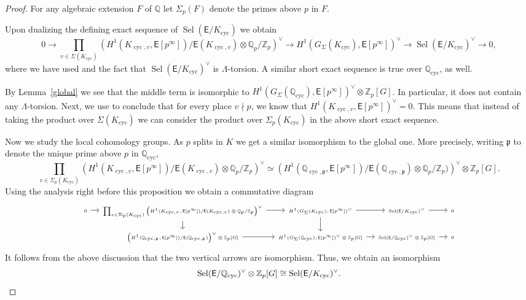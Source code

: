 \documentclass{amsart}
\numberwithin{equation}{section}
\theoremstyle{remark}
\newcommand{\cyc}{\operatorname{cyc}}
\newcommand{\Sel}{\operatorname{Sel}}
\newcommand{\Z}{\mathbb{Z}}
\newcommand{\Qp}{\mathbb{Q}_p}
\newcommand{\Q}{\mathbb{Q}}
\newcommand{\EC}{\mathsf{E}}
\newcommand{\fp}{\mathfrak{p}}
\theoremstyle{plain} %
\begin{document}
\begin{proof}
For any algebraic extension $F$ of $\Q$ let $\Sigma_p(F)$ denote the primes above $p$ in $F$.


Upon dualizing the defining exact sequence of $\Sel(\EC/K_{\cyc})$ we obtain
\[
0 \longrightarrow \prod_{v\in \Sigma(K_{\cyc})}\left(H^1(K_{\cyc,v},\EC[p^\infty])/\EC(K_{\cyc,v})\otimes \Qp/\Z_p\right)^\vee \longrightarrow H^1(G_\Sigma(K_{\cyc}),\EC[p^\infty])^\vee\longrightarrow \Sel(\EC/K_{\cyc})^\vee\longrightarrow 0,
\]
where we have used \cite[Proposition~2.1]{greenberg-vatsal} and the fact that $\Sel(\EC/K_{\cyc})^\vee$ is $\Lambda$-torsion.
A similar short exact sequence is true over $\Q_{\cyc}$, as well.

By Lemma~\ref{global} we see that the middle term is isomorphic to $H^1(G_\Sigma(\Q_{\cyc}),\EC[p^\infty])^\vee \otimes \Z_p[G]$.
In particular, it does not contain any $\Lambda$-torsion.
Next, we use \cite[Proposition~2]{greenberg} to conclude that for every place $v\nmid p$, we know that $H^1(K_{\cyc,v},\EC[p^\infty])^\vee=0$.
This means that instead of taking the product over $\Sigma(K_{\cyc})$ we can consider the product over $\Sigma_p(K_{\cyc})$ in the above short exact sequence.

Now we study the local cohomology groups.
As $p$ splits in $K$ we get a similar isomorphism to the global one.
More precisely, writing $\fp$ to denote the unique prime above $p$ in $\Q_{\cyc}$,
\[
\prod_{v\in \Sigma_p(K_{\cyc})}\left(H^1(K_{\cyc,v},\EC[p^\infty])/\EC(K_{\cyc,v})\otimes \Qp/\Z_p\right)^\vee \simeq \left(H^1(\Q_{\cyc,\fp},\EC[p^\infty])/\EC(\Q_{\cyc,\fp})\otimes \Q_p/\Z_p)\right)^\vee\otimes \Z_p[G].
\]
Using the analysis right before this proposition we obtain a commutative diagram
    \[\begin{tikzcd}[font=\tiny, column sep=1em, row sep=1em]
        0\arrow[r]&\prod_{v\in \Sigma_p(K_{\cyc})}\left(H^1(K_{\cyc,v},\EC[p^\infty])/\EC(K_{\cyc,v})\otimes \Qp/\Z_p\right)^\vee\arrow[r]\arrow[d]&H^1(G_\Sigma(K_{\cyc}),\EC[p^\infty])^\vee\arrow[d]\arrow[r]&\Sel(\EC/K_{\cyc})^\vee\arrow[r]&0\\
       & \left(H^1(\Q_{\cyc,\fp},\EC[p^\infty])/\EC(\Q_{\cyc,\fp})\right)^\vee\otimes \Z_p[G]\arrow[r]&H^1(G_\Sigma(\Q_{\cyc}),\EC[p^\infty])^\vee\otimes \Z_p[G]\arrow[r]&\Sel(\EC/\Q_{\cyc})^\vee\otimes\Z_p[G]\arrow[r]&0
    \end{tikzcd}\]  
It follows from the above discussion that the two vertical arrows are isomorphism.
Thus, we obtain an isomorphism
\[
\Sel(\EC/\Q_{\cyc})^\vee\otimes \Z_p[G]\cong \Sel(\EC/K_{\cyc})^\vee. \qedhere
\]
\end{proof}
\end{document}
